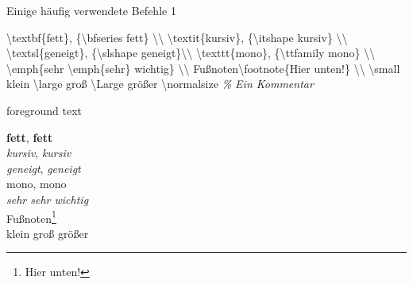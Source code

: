 \documentclass[aspectratio=169]{beamer}
\newenvironment{Shaded}{\begin{snugshade}}{\end{snugshade}}
\newcommand{\CommentTok}[1]{\textcolor[rgb]{0.57,0.57,0.57}{\textit{#1}}}
\newcommand{\FunctionTok}[1]{\textcolor[rgb]{0.34,0.51,0.35}{#1}}
\newcommand{\NormalTok}[1]{\textcolor[rgb]{0.19,0.19,0.19}{#1}}
\newenvironment{Shaded}{}{}
\begin{document}
    \begin{frame}[fragile]{Einige häufig verwendete Befehle 1}
    \protect\hypertarget{einige-huxe4ufig-verwendete-befehle-1}{}
    \begin{minipage}{0.66\textwidth}

\begin{Shaded}
\begin{Highlighting}[]
\FunctionTok{\textbackslash{}textbf}\NormalTok{\{fett\}, \{}\FunctionTok{\textbackslash{}bfseries}\NormalTok{ fett\} }\FunctionTok{\textbackslash{}\textbackslash{}}
\FunctionTok{\textbackslash{}textit}\NormalTok{\{kursiv\}, \{}\FunctionTok{\textbackslash{}itshape}\NormalTok{ kursiv\} }\FunctionTok{\textbackslash{}\textbackslash{}}
\FunctionTok{\textbackslash{}textsl}\NormalTok{\{geneigt\}, \{}\FunctionTok{\textbackslash{}slshape}\NormalTok{ geneigt\}}\FunctionTok{\textbackslash{}\textbackslash{}}
\FunctionTok{\textbackslash{}texttt}\NormalTok{\{mono\}, \{}\FunctionTok{\textbackslash{}ttfamily}\NormalTok{ mono\} }\FunctionTok{\textbackslash{}\textbackslash{}}
\FunctionTok{\textbackslash{}emph}\NormalTok{\{sehr }\FunctionTok{\textbackslash{}emph}\NormalTok{\{sehr\} wichtig\} }\FunctionTok{\textbackslash{}\textbackslash{}}
\NormalTok{Fußnoten}\FunctionTok{\textbackslash{}footnote}\NormalTok{\{Hier unten!\} }\FunctionTok{\textbackslash{}\textbackslash{}}
\FunctionTok{\textbackslash{}small}\NormalTok{ klein }\FunctionTok{\textbackslash{}large}\NormalTok{ groß}
\FunctionTok{\textbackslash{}Large}\NormalTok{ größer }\FunctionTok{\textbackslash{}normalsize}
\CommentTok{\% Ein Kommentar}
\end{Highlighting}
\end{Shaded}

    \end{minipage}\begin{minipage}{0.33\textwidth}

    \bgroup 
        \begin{OutputBox}
        \begin{beamercolorbox}{foreground text}
            \selectfont%

    \textbf{fett}, {\bfseries fett} \\
    \textit{kursiv}, {\itshape kursiv} \\
    \textsl{geneigt}, {\slshape geneigt}\\
    {\selectfont mono}, {\selectfont mono} \\
    \emph{sehr \emph{sehr} wichtig} \\
    Fußnoten\footnote{\selectfont Hier unten!} \\
    \small klein \large groß
    \Large größer \normalsize

            \end{beamercolorbox}
        \end{OutputBox}
    \egroup

    \end{minipage}
    \end{frame}
\end{document}
